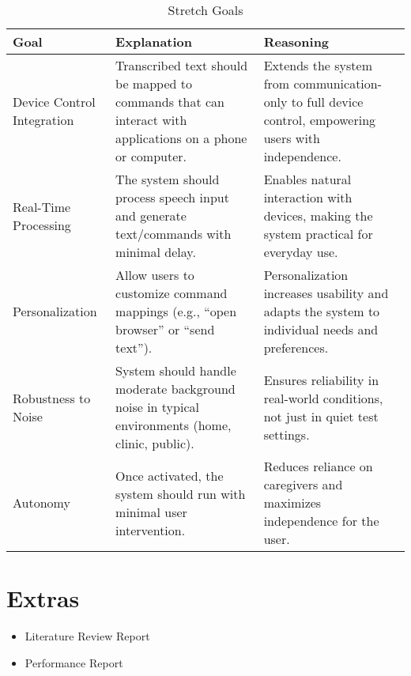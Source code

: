 \documentclass{article}
\begin{document}
\begin{table}[hp]
\caption{Stretch Goals}
\begin{tabularx}{\textwidth}{lXX}
\toprule
\textbf{Goal} & \textbf{Explanation} & \textbf{Reasoning}\\
\midrule
Device Control Integration & Transcribed text should be mapped to commands that can interact with applications on a phone or computer. & Extends the system from communication-only to full device control, empowering users with independence.\\
Real-Time Processing & The system should process speech input and generate text/commands with minimal delay. & Enables natural interaction with devices, making the system practical for everyday use.\\
Personalization & Allow users to customize command mappings (e.g., ``open browser'' or ``send text''). & Personalization increases usability and adapts the system to individual needs and preferences.\\
Robustness to Noise & System should handle moderate background noise in typical environments (home, clinic, public). & Ensures reliability in real-world conditions, not just in quiet test settings.\\
Autonomy & Once activated, the system should run with minimal user intervention. & Reduces reliance on caregivers and maximizes independence for the user.\\
\bottomrule
\end{tabularx}
\end{table}

\newpage

\section{Extras}


\begin{itemize}
    \item Literature Review Report
    \item Performance Report
\end{itemize}
\end{document}
